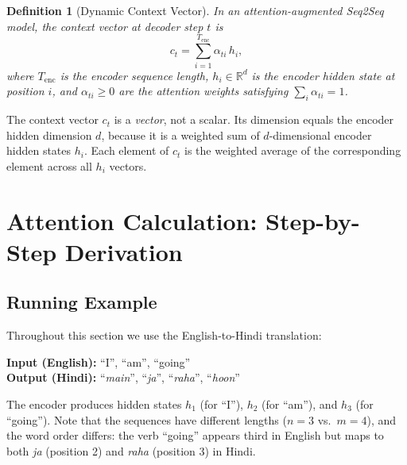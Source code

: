 \documentclass[12pt,a4paper]{article}
\newtheorem{definition}{Definition}[section]
\begin{document}
\begin{definition}[Dynamic Context Vector]
\label{def:dyn-ctx}
In an attention-augmented Seq2Seq model, the context vector at
decoder step $t$ is
\begin{equation}
  c_t = \sum_{i=1}^{T_{\mathrm{enc}}} \alpha_{ti}\, h_i,
  \label{eq:ctx-dynamic}
\end{equation}
where $T_{\mathrm{enc}}$ is the encoder sequence length,
$h_i \in \mathbb{R}^{d}$ is the encoder hidden state at position $i$,
and $\alpha_{ti} \geq 0$ are the \emph{attention weights} satisfying
$\sum_i \alpha_{ti} = 1$.
\end{definition}

\begin{keyinsight}[title=Dimensionality of $c_t$]
  The context vector $c_t$ is a \emph{vector}, not a scalar.  Its
  dimension equals the encoder hidden dimension $d$, because it is a
  weighted sum of $d$-dimensional encoder hidden states $h_i$.
  Each element of $c_t$ is the weighted average of the corresponding
  element across all $h_i$ vectors.
\end{keyinsight}

\section{Attention Calculation: Step-by-Step Derivation}
\label{sec:calc}

\subsection{Running Example}

Throughout this section we use the English-to-Hindi translation:

\begin{center}
  \textbf{Input (English):} \quad ``I'', ``am'', ``going'' \\[4pt]
  \textbf{Output (Hindi):}  \quad ``\textit{main}'', ``\textit{ja}'',
                                    ``\textit{raha}'', ``\textit{hoon}''
\end{center}

The encoder produces hidden states $h_1$ (for ``I''), $h_2$ (for
``am''), and $h_3$ (for ``going'').  Note that the sequences have
different lengths ($n=3$ vs.\ $m=4$), and the word order differs:
the verb ``going'' appears third in English but maps to both
\textit{ja} (position 2) and \textit{raha} (position 3) in Hindi.
\end{document}
